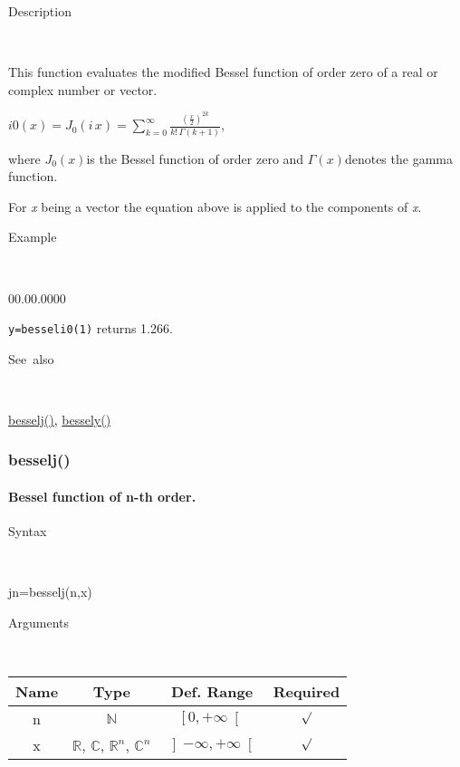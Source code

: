 \begin{description}
\item [Description]~
\end{description}
This function evaluates the modified Bessel function of order zero
of a real or complex number or vector.

\medskip{}
$i0\left(x\right)=J_{0}\left(i\, x\right)={\displaystyle \sum\limits _{k=0}^{\infty}\frac{\left(\frac{x}{2}\right)^{2k}}{k!\,\Gamma\left(k+1\right)}}$,
\medskip{}

where $J_{0}\left(x\right)$is the Bessel function of order zero and
$\Gamma\left(x\right)$denotes the gamma function.
\medskip{}

For \textit{x} being a vector the equation above is applied
to the components of \textit{x}.

\begin{description}
\item [Example]~
\end{description}
\begin{lyxlist}{00.00.0000}
\item [\texttt{y=besseli0(1)}]returns 1.266.
\end{lyxlist}
\begin{description}
\item [See~also]~
\end{description}
\textcolor{blue}{\hyperlink{besselj}{besselj()}}\textcolor{black}{,}
\textcolor{blue}{\hyperlink{bessely}{bessely()}}


\newpage
\subsubsection*{\hypertarget{besselj}{}{\Large besselj()}}


\paragraph{\label{par:Bessel-function}Bessel function of n-th order.}

\begin{description}
\item [Syntax]~
\end{description}
jn=besselj(n,x)

\begin{description}
\item [Arguments]~
\end{description}
\begin{tabular}{|c|c|c|c|}
\hline 
Name&
Type&
Def. Range&
Required\tabularnewline
\hline
\hline 
n&
$\mathbb{N}$&
$\left[0,+\infty\right[$&
$\surd$\tabularnewline
\hline
x&
$\mathbb{R}$, $\mathbb{C}$, $\mathbb{R}^{n}$, $\mathbb{C}^{n}$&
$\left]-\infty,+\infty\right[$&
$\surd$\tabularnewline
\hline
\end{tabular}

